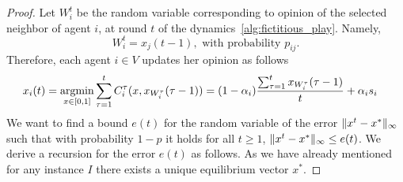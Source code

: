 \begin{proof}
  Let $W_i^t$ be the random variable corresponding to opinion of the
  selected neighbor of agent $i$, at round $t$ of the
  dynamics~\ref{alg:fictitious_play}. Namely,
  \[
    W_i^t = x_j(t-1),  \text{ with probability } p_{ij}.
  \]
  Therefore, each agent $i \in V$ updates her opinion as follows
  \begin{align*}
    x_i(t)
    &=
    \operatorname*{argmin}_{x \in [0,1]}
    \sum_{\tau=1}^tC^{\tau}_i(x,x_{W_i^{\tau}}(\tau-1))
    =
    (1-\alpha_i)\frac{\sum_{\tau=1}^{t} x_{W_i^\tau}(\tau-1)}{t}
    + \alpha_i s_i
  \end{align*}
  We want to find a bound $e(t)$ for the random variable
  of the error $\| x^t - x^* \|_{\infty}$ such that with probability
  $1-p$ it holds for all $t \geq 1$, $\| x^t - x^* \|_{\infty} \leq e(t)$.
  We derive a recursion for the error $e(t)$ as follows.
  As we have already mentioned for any instance $I$ there exists
  a unique equilibrium vector $x^*$.


\end{proof}
